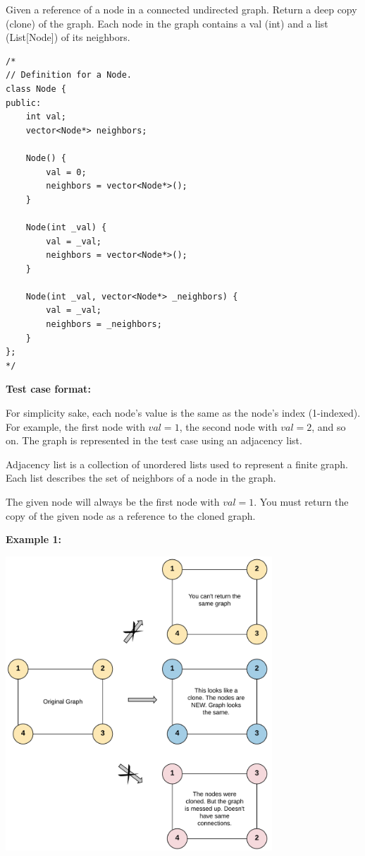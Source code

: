 \documentclass[a4paper]{article}
\begin{document}
Given a reference of a node in a connected undirected graph. Return a deep copy (clone) of the graph. Each node in the graph contains a val (int) and a list (List[Node]) of its neighbors.

\begin{lstlisting}[style=C++]
/*
// Definition for a Node.
class Node {
public:
    int val;
    vector<Node*> neighbors;
    
    Node() {
        val = 0;
        neighbors = vector<Node*>();
    }
    
    Node(int _val) {
        val = _val;
        neighbors = vector<Node*>();
    }
    
    Node(int _val, vector<Node*> _neighbors) {
        val = _val;
        neighbors = _neighbors;
    }
};
*/
\end{lstlisting}

\textbf{Test case format:}

For simplicity sake, each node's value is the same as the node's index (1-indexed). For example, the first node with $val = 1$, the second node with $val = 2$, and so on. The graph is represented in the test case using an adjacency list.

Adjacency list is a collection of unordered lists used to represent a finite graph. Each list describes the set of neighbors of a node in the graph.

The given node will always be the first node with $val = 1$. You must return the copy of the given node as a reference to the cloned graph.

\SPACE

\textbf{Example 1:}

\begin{center}
\includegraphics[width=10cm]{images/1.png}
\end{center}
\end{document}
